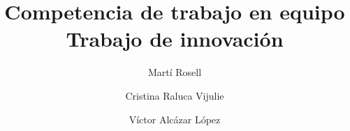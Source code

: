

\title{Competencia de trabajo en equipo \\
Trabajo de innovación}
\author{
  Martí Rosell \and
  Cristina Raluca Vijulie \and
  Víctor Alcázar López 
}


\maketitle
\tableofcontents







